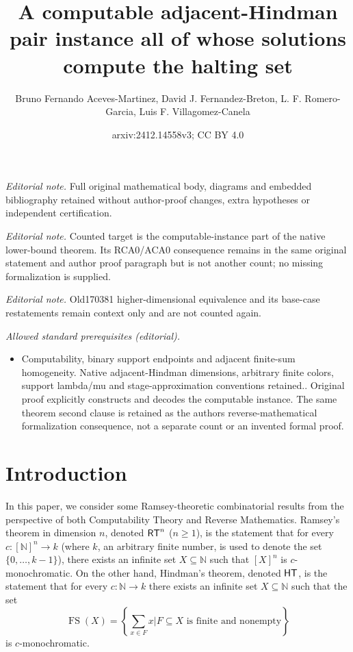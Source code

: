 \documentclass[10pt,a4paper]{amsart}
\title{A computable adjacent-Hindman pair instance all of whose solutions compute the halting set}
\author{Bruno Fernando Aceves-Martinez, David J. Fernandez-Breton, L. F. Romero-Garcia, Luis F. Villagomez-Canela}
\date{arxiv:2412.14558v3; CC BY 4.0}
\newcommand{\rt}{\mathnormal{\mathsf{RT}}}
\newcommand{\hind}{\mathnormal{\mathsf{HT}}}
\DeclareMathOperator{\fs}{FS}
\theoremstyle{definition}
\begin{document}
\maketitle
\noindent\textit{Editorial note.} Full original mathematical body, diagrams and embedded bibliography retained without author-proof changes, extra hypotheses or independent certification.\par\medskip
\noindent\textit{Editorial note.} Counted target is the computable-instance part of the native lower-bound theorem. Its RCA0/ACA0 consequence remains in the same original statement and author proof paragraph but is not another count; no missing formalization is supplied.\par\medskip
\noindent\textit{Editorial note.} Old170381 higher-dimensional equivalence and its base-case restatements remain context only and are not counted again.\par\medskip
\noindent\textit{Allowed standard prerequisites (editorial).}\begin{itemize}
\item Computability, binary support endpoints and adjacent finite-sum homogeneity. Native adjacent-Hindman dimensions, arbitrary finite colors, support lambda/mu and stage-approximation conventions retained.. Original proof explicitly constructs and decodes the computable instance. The same theorem second clause is retained as the authors reverse-mathematical formalization consequence, not a separate count or an invented formal proof.
\end{itemize}\medskip
\section{Introduction}

In this paper, we consider some Ramsey-theoretic combinatorial results from the perspective of both Computability Theory and Reverse Mathematics. Ramsey's theorem in dimension $n$, denoted $\rt^n$ ($n\geq 1$), is the statement that for every $c:[\mathbb N]^n\longrightarrow k$ (where $k$, an arbitrary finite number, is used to denote the set $\{0,\ldots,k-1\}$), there exists an infinite set $X\subseteq\mathbb N$ such that $[X]^n$ is $c$-monochromatic. On the other hand, Hindman's theorem, denoted $\hind$, is the statement that for every $c:\mathbb N\longrightarrow k$ there exists an infinite set $X\subseteq\mathbb N$ such that the set
\begin{equation*}
\fs(X)=\left\{\sum_{x\in F}x\bigg|F\subseteq X\text{ is finite and nonempty}\right\}
\end{equation*}
is $c$-monochromatic.
\end{document}
